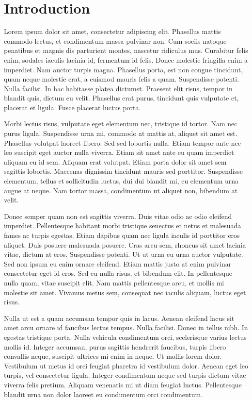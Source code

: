 \chapter{Introduction}
Lorem ipsum dolor sit amet, consectetur adipiscing elit.
Phasellus mattis commodo lectus, et condimentum massa pulvinar non.
Cum sociis natoque penatibus et magnis dis parturient montes, nascetur ridiculus mus.
Curabitur felis enim, sodales iaculis lacinia id, fermentum id felis.
Donec molestie fringilla enim a imperdiet.
Nam auctor turpis magna.
Phasellus porta, est non congue tincidunt, quam neque molestie erat, a euismod mauris felis a quam.
Suspendisse potenti.
Nulla facilisi.
In hac habitasse platea dictumst.
Praesent elit risus, tempor in blandit quis, dictum eu velit.
Phasellus erat purus, tincidunt quis vulputate et, placerat et ligula.
Fusce placerat luctus porta.

Morbi lectus risus, vulputate eget elementum nec, tristique id tortor.
Nam nec purus ligula.
Suspendisse urna mi, commodo at mattis at, aliquet sit amet est.
Phasellus volutpat laoreet libero.
Sed sed lobortis nulla.
Etiam tempor ante nec leo suscipit eget auctor nulla viverra.
Etiam sit amet ante eu quam imperdiet aliquam eu id sem.
Aliquam erat volutpat.
Etiam porta dolor sit amet sem sagittis lobortis.
Maecenas dignissim tincidunt mauris sed porttitor.
Suspendisse elementum, tellus et sollicitudin luctus, dui dui blandit mi, eu elementum urna augue at neque.
Nam tortor massa, condimentum ut aliquet non, bibendum at velit.

Donec semper quam non est sagittis viverra.
Duis vitae odio ac odio eleifend imperdiet.
Pellentesque habitant morbi tristique senectus et netus et malesuada fames ac turpis egestas.
Etiam dapibus quam nec ligula iaculis id porttitor eros aliquet.
Duis posuere malesuada posuere.
Cras arcu sem, rhoncus sit amet lacinia vitae, dictum at eros.
Suspendisse potenti.
Ut ut urna eu urna auctor vulputate.
Sed non ipsum eu enim ornare eleifend.
Etiam mattis justo at enim pulvinar consectetur eget id eros.
Sed eu nulla risus, et bibendum elit.
In pellentesque nulla quam, vitae suscipit elit.
Nam mattis pellentesque arcu, et mollis mi molestie sit amet.
Vivamus metus sem, consequat nec iaculis aliquam, luctus eget risus.

Nulla ut est a quam accumsan tempor quis in lacus.
Aenean eleifend lacus sit amet arcu ornare id faucibus lectus tempus.
Nulla facilisi.
Donec in tellus nibh.
In egestas tristique porta.
Nulla vehicula condimentum orci, scelerisque varius lectus mollis id.
Integer accumsan, purus sagittis hendrerit faucibus, turpis libero convallis neque, suscipit ultrices mi enim in neque.
Ut mollis lorem dolor.
Vestibulum ut metus id orci feugiat pharetra id vestibulum dolor.
Aenean eget leo turpis, vel consectetur ligula.
Integer condimentum neque sed turpis dictum vitae viverra felis pretium.
Aliquam venenatis mi ut diam feugiat luctus.
Pellentesque blandit urna non dolor laoreet eu condimentum orci condimentum.


